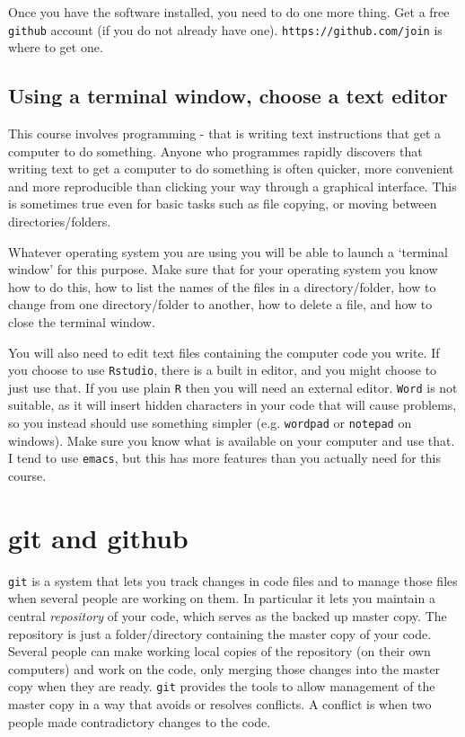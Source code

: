 \documentclass[10pt] {article}
\theoremstyle{definition}
\begin{document}
Once you have the software installed, you need to do one more thing. Get a free {\tt github} account (if you do not already have one).  \lstinline+https://github.com/join+ is where to get one. 


\subsection{Using a terminal window, choose a text editor}

This course involves programming - that is writing text instructions that get a computer to do something. Anyone who programmes rapidly discovers that writing text to get a computer to do something is often quicker, more convenient and more reproducible than clicking your way through a graphical interface. This is sometimes true even for basic tasks such as file copying, or moving between directories/folders. 

Whatever operating system you are using you will be able to launch a `terminal window' for this purpose. Make sure that for your operating system you know how to do this, how to list the names of the files in a directory/folder, how to change from one directory/folder to another, how to delete a file, and how to close the terminal window. 

You will also need to edit text files containing the computer code you write. If you choose to use {\tt Rstudio}, there is a built in editor, and you might choose to just use that. If you use plain {\tt R} then you will need an external editor. {\tt Word} is not suitable, as it will insert hidden characters in your code that will cause problems, so you instead should use something simpler (e.g. {\tt wordpad} or {\tt notepad} on windows). Make sure you know what is available on your computer and use that. I tend to use {\tt emacs}, but this has more features than you actually need for this course. 

\section{git and github}

{\tt git} is a system that lets you track changes in code files and to manage those files when several people are working on them. In particular it lets you maintain a central {\em repository} of your code, which serves as the backed up master copy. The repository is just a folder/directory containing the master copy of your code. Several people can make working local copies of the repository (on their own computers) and work on the code, only merging those changes into the master copy when they are ready. {\tt git} provides the tools to allow management of the master copy in a way that avoids or resolves conflicts. A conflict is when two people made contradictory changes to the code. 
\end{document}
